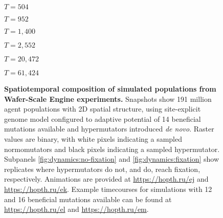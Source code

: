 \begin{figure}[ht]
  \begin{minipage}[c]{0.154\textwidth}
\hfill
\begin{varwidth}{\textwidth}
$T = 504$
\end{varwidth}
\hfill
  \end{minipage}
  \begin{minipage}[c]{0.154\textwidth}
\hfill
\begin{varwidth}{\textwidth}
$T = 952$
\end{varwidth}
\hfill
  \end{minipage}
  \begin{minipage}[c]{0.154\textwidth}
\hfill
\begin{varwidth}{\textwidth}
$T = 1,400$
\end{varwidth}
\hfill
  \end{minipage}
  \begin{minipage}[c]{0.154\textwidth}
\hfill
\begin{varwidth}{\textwidth}
$T = 2,552$
\end{varwidth}
\hfill
  \end{minipage}
  \begin{minipage}[c]{0.154\textwidth}
\hfill
\begin{varwidth}{\textwidth}
$T = 20,472$
\end{varwidth}
\hfill
  \end{minipage}
  \begin{minipage}[c]{0.154\textwidth}
\hfill
\begin{varwidth}{\textwidth}
$T = 61,424$
\end{varwidth}
\hfill
  \end{minipage}
  \caption{
  \textbf{Spatiotemporal composition of simulated populations from Wafer-Scale Engine experiments.}
  \footnotesize
  Snapshots show 191 million agent populations with 2D spatial structure, using site-explicit genome model configured to adaptive potential of 14 beneficial mutations available and hypermutators introduced \textit{de novo}.
  Raster values are binary, with white pixels indicating a sampled normomutators and black pixels indicating a sampled hypermutator.
  Subpanels \ref{fig:dynamics:no-fixation} and       \ref{fig:dynamics:fixation} show replicates where hypermutators do not, and do, reach fixation, respectively.
  Animations are provided at \url{https://hopth.ru/ej} and \url{https://hopth.ru/ek}.
  Example timecourses for simulations with 12 and 16 beneficial mutations available can be found at \url{https://hopth.ru/el} and \url{https://hopth.ru/em}.
  }
  \label{fig:dynamics}
\end{figure}
